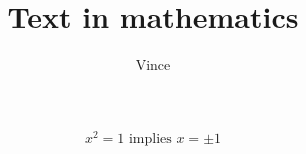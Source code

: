 \documentclass{article}
\title{Text in mathematics}
\author{Vince}
\begin{document}
\maketitle

\[x^2=1\text{ implies }x=\pm 1\]
\end{document}
